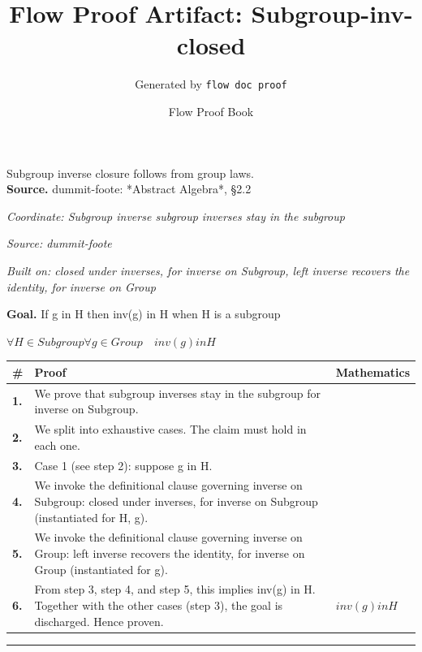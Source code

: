 \documentclass[11pt]{article}
\title{Flow Proof Artifact: Subgroup-inv-closed}
\author{Generated by \texttt{flow doc proof}}
\date{Flow Proof Book}
\theoremstyle{definition}
\begin{document}
\maketitle
Subgroup inverse closure follows from group laws.\\[0.5em]
\textbf{Source.} dummit-foote: *Abstract Algebra*, §2.2\\[0.5em]
\bigskip
{}\par
\smallskip\noindent\textit{Coordinate: Subgroup \cdot inverse \cdot subgroup inverses stay in the subgroup}\par
\smallskip\noindent\textit{Source: dummit-foote}\par
\smallskip\noindent\textit{Built on: closed under inverses, for inverse on Subgroup, left inverse recovers the identity, for inverse on Group}\par
\medskip
\noindent\textbf{Goal.} If g in H then inv(g) in H when H is a subgroup\par
\noindent$\displaystyle \forall H \in Subgroup \forall g \in Group\quad inv(g) in H$\par
\medskip
\noindent
\begin{tabular}{@{} >{\raggedright\arraybackslash}p{} >{\raggedright\arraybackslash}p{} >{\raggedleft\arraybackslash}p{} @{}}
\textbf{\#} & \textbf{Proof} & \textbf{Mathematics} \\
\midrule
\textbf{1.} & We prove that subgroup inverses stay in the subgroup for inverse on Subgroup. & \\[0.45em]
\textbf{2.} & We split into exhaustive cases. The claim must hold in each one. & \\[0.45em]
\textbf{3.} & Case 1 (see step 2): suppose g in H. & \\[0.45em]
\textbf{4.} & We invoke the definitional clause governing inverse on Subgroup: closed under inverses, for inverse on Subgroup (instantiated for H, g). & \\[0.45em]
\textbf{5.} & We invoke the definitional clause governing inverse on Group: left inverse recovers the identity, for inverse on Group (instantiated for g). & \\[0.45em]
\textbf{6.} & From step 3, step 4, and step 5, this implies inv(g) in H. Together with the other cases (step 3), the goal is discharged. Hence proven. & $\displaystyle inv(g) in H$ \\[0.45em]
\bottomrule
\end{tabular}
\label{thm:Subgroup-inverse-subgroup_inverses_stay_in_the_subgroup}
\par\medskip\hrule
\end{document}

